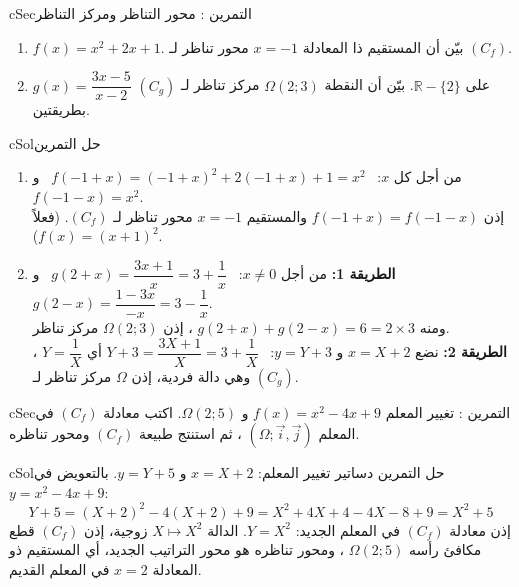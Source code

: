 \documentclass[12pt,a4paper]{article}
\newenvironment{BOX}[2]{\begin{otherlanguage}{english}\begin{arbox}{#1}{#2}}{\end{arbox}\end{otherlanguage}}
\newcounter{exo}
\newenvironment{tamrin}[1]{\stepcounter{exo}\begin{BOX}{cSec}{التمرين \theexo: #1}}{\end{BOX}}
\newenvironment{hal}{\Needspace{12\baselineskip}\begin{otherlanguage}{english}\begin{arbox}[breakable]{cSol}{حل التمرين \theexo}}{\end{arbox}\end{otherlanguage}}
\newcommand{\R}{\mathbb{R}}
\begin{document}
\begin{tamrin}{محور التناظر ومركز التناظر}
\begin{enumerate}
\item $f(x)=x^2+2x+1$. بيّن أن المستقيم ذا المعادلة $x=-1$ محور تناظر لـ $(C_f)$.
\item $g(x)=\dfrac{3x-5}{x-2}$ على $\R-\{2\}$. بيّن أن النقطة $\Omega(2;3)$ مركز تناظر لـ $(C_g)$ بطريقتين.
\end{enumerate}
\end{tamrin}
\begin{hal}
\begin{enumerate}
\item من أجل كل $x$: \ $f(-1+x)=(-1+x)^2+2(-1+x)+1=x^2$ \ و \ $f(-1-x)=x^2$.\\
إذن $f(-1+x)=f(-1-x)$ والمستقيم $x=-1$ محور تناظر لـ $(C_f)$. (فعلاً $f(x)=(x+1)^2$).
\item \textbf{الطريقة 1:} من أجل $x\ne0$: \ $g(2+x)=\dfrac{3x+1}{x}=3+\dfrac1x$ \ و \ $g(2-x)=\dfrac{1-3x}{-x}=3-\dfrac1x$.\\
ومنه $g(2+x)+g(2-x)=6=2\times3$ ، إذن $\Omega(2;3)$ مركز تناظر.\\[3pt]
\textbf{الطريقة 2:} نضع $x=X+2$ و $y=Y+3$: \ $Y+3=\dfrac{3X+1}{X}=3+\dfrac1X$ أي $Y=\dfrac1X$ ،
وهي دالة فردية، إذن $\Omega$ مركز تناظر لـ $(C_g)$.
\end{enumerate}
\end{hal}

\begin{tamrin}{تغيير المعلم}
$f(x)=x^2-4x+9$ و $\Omega(2;5)$. اكتب معادلة $(C_f)$ في المعلم $\left(\Omega;\vec i,\vec j\right)$ ، ثم استنتج طبيعة $(C_f)$ ومحور تناظره.
\end{tamrin}
\begin{hal}
دساتير تغيير المعلم: $x=X+2$ و $y=Y+5$. بالتعويض في $y=x^2-4x+9$:
\[Y+5=(X+2)^2-4(X+2)+9=X^2+4X+4-4X-8+9=X^2+5\]
إذن معادلة $(C_f)$ في المعلم الجديد: $\boxed{Y=X^2}$. الدالة $X\mapsto X^2$ زوجية، إذن $(C_f)$ قطع مكافئ رأسه $\Omega(2;5)$ ،
ومحور تناظره هو محور التراتيب الجديد، أي المستقيم ذو المعادلة $\boxed{x=2}$ في المعلم القديم.
\end{hal}

\end{document}
